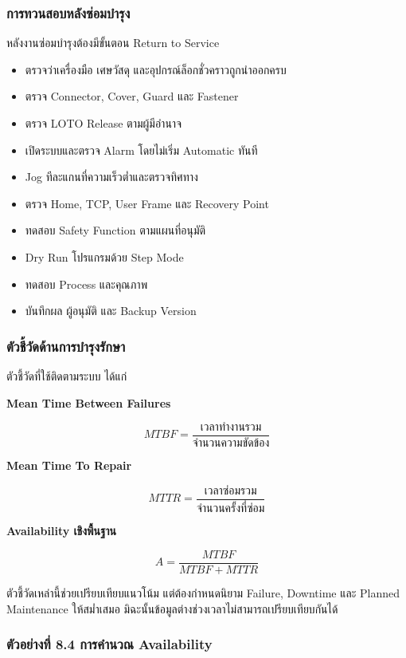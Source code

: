 \subsubsection{การทวนสอบหลังซ่อมบำรุง}

หลังงานซ่อมบำรุงต้องมีขั้นตอน Return to Service

\begin{itemize}
    \item ตรวจว่าเครื่องมือ เศษวัสดุ และอุปกรณ์ล็อกชั่วคราวถูกนำออกครบ
    \item ตรวจ Connector, Cover, Guard และ Fastener
    \item ตรวจ LOTO Release ตามผู้มีอำนาจ
    \item เปิดระบบและตรวจ Alarm โดยไม่เริ่ม Automatic ทันที
    \item Jog ทีละแกนที่ความเร็วต่ำและตรวจทิศทาง
    \item ตรวจ Home, TCP, User Frame และ Recovery Point
    \item ทดสอบ Safety Function ตามแผนที่อนุมัติ
    \item Dry Run โปรแกรมด้วย Step Mode
    \item ทดสอบ Process และคุณภาพ
    \item บันทึกผล ผู้อนุมัติ และ Backup Version
\end{itemize}

\subsubsection{ตัวชี้วัดด้านการบำรุงรักษา}

ตัวชี้วัดที่ใช้ติดตามระบบ ได้แก่

\textbf{Mean Time Between Failures}

\[
MTBF=\frac{\text{เวลาทำงานรวม}}{\text{จำนวนความขัดข้อง}}
\]

\textbf{Mean Time To Repair}

\[
MTTR=\frac{\text{เวลาซ่อมรวม}}{\text{จำนวนครั้งที่ซ่อม}}
\]

\textbf{Availability เชิงพื้นฐาน}

\[
A=\frac{MTBF}{MTBF+MTTR}
\]

ตัวชี้วัดเหล่านี้ช่วยเปรียบเทียบแนวโน้ม แต่ต้องกำหนดนิยาม Failure, Downtime และ Planned Maintenance ให้สม่ำเสมอ มิฉะนั้นข้อมูลต่างช่วงเวลาไม่สามารถเปรียบเทียบกันได้

\subsubsection{ตัวอย่างที่ 8.4 การคำนวณ Availability}

